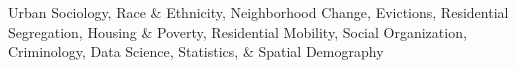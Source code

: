 

\begin{cvparagraph}

Urban Sociology, Race \& Ethnicity, Neighborhood Change, Evictions, Residential Segregation, Housing \& Poverty, Residential Mobility, Social Organization, Criminology, Data Science, Statistics, \& Spatial Demography\newline
\end{cvparagraph}
